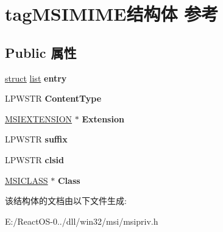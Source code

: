\hypertarget{structtag_m_s_i_m_i_m_e}{}\section{tag\+M\+S\+I\+M\+I\+M\+E结构体 参考}
\label{structtag_m_s_i_m_i_m_e}
\subsection*{Public 属性}
\begin{DoxyCompactItemize}
\item 
\mbox{\label{structtag_m_s_i_m_i_m_e_ac87cb1da741b40e0ece5c6b8591627c9}} 
\hyperlink{interfacestruct}{struct} \hyperlink{classlist}{list} {\bfseries entry}
\item 
\mbox{\label{structtag_m_s_i_m_i_m_e_a7a1bba52b15057be672272d50e71b1a3}} 
L\+P\+W\+S\+TR {\bfseries Content\+Type}
\item 
\mbox{\label{structtag_m_s_i_m_i_m_e_a6139a51179154af03242d81354baeb1a}} 
\hyperlink{structtag_m_s_i_e_x_t_e_n_s_i_o_n}{M\+S\+I\+E\+X\+T\+E\+N\+S\+I\+ON} $\ast$ {\bfseries Extension}
\item 
\mbox{\label{structtag_m_s_i_m_i_m_e_af8134ddc38623ac9e6a78bec202c6a73}} 
L\+P\+W\+S\+TR {\bfseries suffix}
\item 
\mbox{\label{structtag_m_s_i_m_i_m_e_ab1177acfab1b7b0cf30ec14cccc634a4}} 
L\+P\+W\+S\+TR {\bfseries clsid}
\item 
\mbox{\label{structtag_m_s_i_m_i_m_e_aebc865f39a178e56517b20370d8fe0ed}} 
\hyperlink{structtag_m_s_i_c_l_a_s_s}{M\+S\+I\+C\+L\+A\+SS} $\ast$ {\bfseries Class}
\end{DoxyCompactItemize}


该结构体的文档由以下文件生成\+:\begin{DoxyCompactItemize}
\item 
E\+:/\+React\+O\+S-\/0../dll/win32/msi/msipriv.\+h\end{DoxyCompactItemize}
